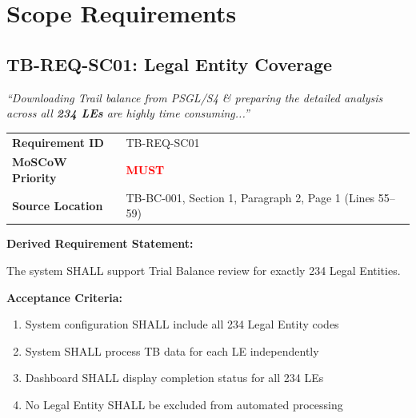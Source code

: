 \section{Scope Requirements}
\label{sec:req-scope}

\subsection{TB-REQ-SC01: Legal Entity Coverage}
\label{req:tb-req-sc01}

\begin{tcolorbox}[colback=sourcegreen!5,colframe=sourcegreen!70,title=Source Quotation]
\textit{``Downloading Trail balance from PSGL/S4 \& preparing the detailed 
analysis across all \textbf{234 LEs} are highly time consuming...''}
\end{tcolorbox}

\begin{tabularx}{\textwidth}{@{}lX@{}}
\toprule
\textbf{Requirement ID} & TB-REQ-SC01 \\
\textbf{MoSCoW Priority} & \textcolor{red}{\textbf{MUST}} \\
\textbf{Source Location} & TB-BC-001, Section 1, Paragraph 2, Page 1 (Lines 55--59) \\
\bottomrule
\end{tabularx}

\vspace{0.5em}
\textbf{Derived Requirement Statement:}

The system SHALL support Trial Balance review for exactly 234 Legal Entities.

\textbf{Acceptance Criteria:}
\begin{enumerate}[label=AC-SC01-\arabic*:,leftmargin=*]
    \item System configuration SHALL include all 234 Legal Entity codes
    \item System SHALL process TB data for each LE independently
    \item Dashboard SHALL display completion status for all 234 LEs
    \item No Legal Entity SHALL be excluded from automated processing
\end{enumerate}

